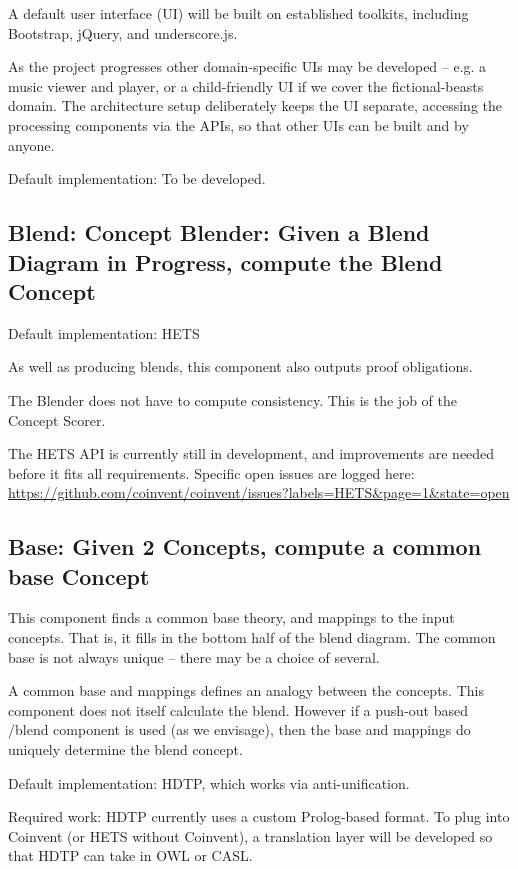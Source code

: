 \documentclass[10pt]{article}
\begin{document}
A default user interface (UI) will be built on established toolkits, including Bootstrap, jQuery, and underscore.js.

As the project progresses other domain-specific UIs may be developed -- e.g. a music viewer and player, 
or a child-friendly UI if we cover the fictional-beasts domain. 
The architecture setup deliberately keeps the UI separate, accessing the processing components via the APIs, so that other UIs can be built and by anyone.

Default implementation: To be developed.

\subsection{Blend: Concept Blender: Given a Blend Diagram in Progress, compute the Blend Concept}

Default implementation: HETS

As well as producing blends, this component also outputs proof obligations.

The Blender does not have to compute consistency. This is the job of the Concept Scorer.

The HETS API is currently still in development, and improvements are needed
before it fits all requirements. Specific open issues are logged here: \url{https://github.com/coinvent/coinvent/issues?labels=HETS&page=1&state=open}

\subsection{Base: Given 2 Concepts, compute a common base Concept}

This component finds a common base theory, and mappings to the input concepts. That is,
it fills in the bottom half of the blend diagram. 
The common base is not always unique -- there may be a choice of several.

A common base and mappings defines an analogy between the concepts. This component does not itself calculate the blend. However if a push-out based /blend component is used (as we envisage), then the base and mappings do uniquely determine the blend concept.

Default implementation: HDTP, which works via anti-unification.

Required work: HDTP currently uses a custom Prolog-based format. To plug into Coinvent (or HETS without Coinvent), a translation layer will be developed so that HDTP can take in OWL or CASL.
\end{document}
